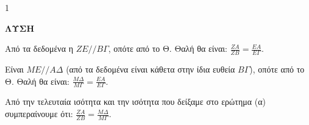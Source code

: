 \begin{ylh}{1}
    \item [Ύλη από εικόνα]
\end{ylh}
\textbf{ΛΥΣΗ}
\begin{alist}
\item Από τα δεδομένα η $ZE // B\Gamma$, οπότε από το Θ. Θαλή θα είναι: $\frac{ZA}{ZB} = \frac{EA}{E\Gamma}$.
\item Είναι $ME // A\Delta$ (από τα δεδομένα είναι κάθετα στην ίδια ευθεία $B\Gamma$), οπότε από το Θ. Θαλή θα είναι: $\frac{M\Delta}{M\Gamma} = \frac{EA}{E\Gamma}$.
\end{alist}
Από την τελευταία ισότητα και την ισότητα που δείξαμε στο ερώτημα (α) συμπεραίνουμε ότι: $\frac{ZA}{ZB} = \frac{M\Delta}{M\Gamma}$.